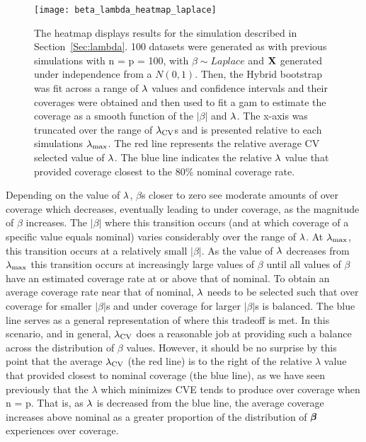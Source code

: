 \begin{figure}[hbtp]
  \begin{center}
  \texttt{[image: beta\_lambda\_heatmap\_laplace]}
  \caption{\label{Fig:beta_lambda_heatmap_laplace} The heatmap displays results for the simulation described in Section~\ref{Sec:lambda}. 100 datasets were generated as with previous simulations with n = p = 100, with $\beta \sim Laplace$ and $\mathbf{X}$ generated under independence from a $N(0,1)$. Then, the Hybrid bootstrap was fit across a range of $\lambda$ values and confidence intervals and their coverages were obtained and then used to fit a gam to estimate the coverage as a smooth function of the $|\beta|$ and $\lambda$. The x-axis was truncated over the range of $\lambda_{\textrm{CV}}$s and is presented relative to each simulations $\lambda_{\max}$. The red line represents the relative average CV selected value of $\lambda$. The blue line indicates the relative $\lambda$ value that provided coverage closest to the 80\% nominal coverage rate.}
  \end{center}
\end{figure}

Depending on the value of $\lambda$, $\beta$s closer to zero see moderate amounts of over coverage which decreases, eventually leading to under coverage, as the magnitude of $\beta$ increases. The $|\beta|$ where this transition occurs (and at which coverage of a specific value equals nominal) varies considerably over the range of $\lambda$. At $\lambda_{\max}$, this transition occurs at a relatively small $|\beta|$. As the value of $\lambda$ decreases from $\lambda_{\max}$ this transition occurs at increasingly large values of $\beta$ until all values of $\beta$ have an estimated coverage rate at or above that of nominal. To obtain an average coverage rate near that of nominal, $\lambda$ needs to be selected such that over coverage for smaller $|\beta|$s and under coverage for larger $|\beta|$s is balanced. The blue line serves as a general representation of where this tradeoff is met. In this scenario, and in general, $\lambda_{\textrm{CV}}$ does a reasonable job at providing such a balance across the distribution of $\beta$ values. However, it should be no surprise by this point that the average $\lambda_{\textrm{CV}}$ (the red line) is to the right of the relative $\lambda$ value that provided closest to nominal coverage (the blue line), as we have seen previously that the $\lambda$ which minimizes CVE tends to produce over coverage when n = p. That is, as $\lambda$ is decreased from the blue line, the average coverage increases above nominal as a greater proportion of the distribution of $\boldsymbol{\beta}$ experiences over coverage.

